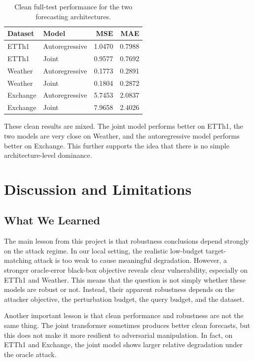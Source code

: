 \documentclass[11pt]{article}
\begin{document}
\begin{table}[t]
\centering
\caption{Clean full-test performance for the two forecasting architectures.}
\label{tab:clean}
\begin{tabular}{llrr}
\toprule
Dataset & Model & MSE & MAE \\
\midrule
ETTh1 & Autoregressive & 1.0470 & 0.7988 \\
ETTh1 & Joint & 0.9577 & 0.7692 \\
Weather & Autoregressive & 0.1773 & 0.2891 \\
Weather & Joint & 0.1804 & 0.2872 \\
Exchange & Autoregressive & 5.7453 & 2.0837 \\
Exchange & Joint & 7.9658 & 2.4026 \\
\bottomrule
\end{tabular}
\end{table}

These clean results are mixed. The joint model performs better on ETTh1, the two models are very close on Weather, and the autoregressive model performs better on Exchange. This further supports the idea that there is no simple architecture-level dominance.

\section{Discussion and Limitations}
\subsection{What We Learned}
The main lesson from this project is that robustness conclusions depend strongly on the attack regime. In our local setting, the realistic low-budget target-matching attack is too weak to cause meaningful degradation. However, a stronger oracle-error black-box objective reveals clear vulnerability, especially on ETTh1 and Weather. This means that the question is not simply whether these models are robust or not. Instead, their apparent robustness depends on the attacker objective, the perturbation budget, the query budget, and the dataset.

Another important lesson is that clean performance and robustness are not the same thing. The joint transformer sometimes produces better clean forecasts, but this does not make it more resilient to adversarial manipulation. In fact, on ETTh1 and Exchange, the joint model shows larger relative degradation under the oracle attack.
\end{document}
